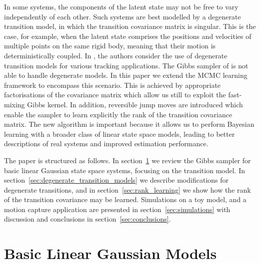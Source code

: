 \documentclass[journal,10pt]{IEEEtran}
\begin{document}
In some systems, the components of the latent state may not be free to vary independently of each other. Such systems are best modelled by a degenerate transition model, in which the transition covariance matrix is singular. This is the case, for example, when the latent state comprises the positions and velocities of multiple points on the same rigid body, meaning that their motion is deterministically coupled. In \cite{Maskell2004,Gustafsson2002}, the authors consider the use of degenerate transition models for various tracking applications. The Gibbs sampler of \cite{Wills2012} is not able to handle degenerate models. In this paper we extend the MCMC learning framework to encompass this scenario. This is achieved by appropriate factorisations of the covariance matrix which allow us still to exploit the fast-mixing Gibbs kernel. In addition, reversible jump moves \cite{Green1995,Green2009} are introduced which enable the sampler to learn explicitly the rank of the transition covariance matrix. The new algorithm is important because it allows us to perform Bayesian learning with a broader class of linear state space models, leading to better descriptions of real systems and improved estimation performance.


The paper is structured as follows. In section~\ref{sec:linear_gaussian_models} we review the Gibbs sampler for basic linear Gaussian state space systems, focusing on the transition model. In section~\ref{sec:degenerate_transition_models} we describe modifications for degenerate transitions, and in section~\ref{sec:rank_learning} we show how the rank of the transition covariance may be learned. Simulations on a toy model, and a motion capture application are presented in section~\ref{sec:simulations} with discussion and conclusions in section~\ref{sec:conclusions}.





\section{Basic Linear Gaussian Models} \label{sec:linear_gaussian_models}
\end{document}
